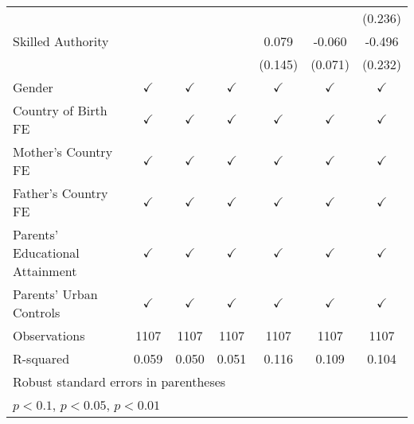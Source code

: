 \documentclass[]{article}
\begin{document}
\begin{table}
\begin{adjustbox}{width=\columnwidth,center}
{\begin{tabular}{l*{6}{c}}
                &                  &                  &                  &                  &                  &  (0.236)         \\
[1em]
Skilled Authority&                  &                  &                  &    0.079         &   -0.060         &   -0.496\sym{**} \\
                &                  &                  &                  &  (0.145)         &  (0.071)         &  (0.232)         \\
\hline
Gender          &$\checkmark$         &$\checkmark$         &$\checkmark$         &$\checkmark$         &$\checkmark$         &$\checkmark$         \\
Country of Birth FE&$\checkmark$         &$\checkmark$         &$\checkmark$         &$\checkmark$         &$\checkmark$         &$\checkmark$         \\
Mother's Country FE&$\checkmark$         &$\checkmark$         &$\checkmark$         &$\checkmark$         &$\checkmark$         &$\checkmark$         \\
Father's Country FE&$\checkmark$         &$\checkmark$         &$\checkmark$         &$\checkmark$         &$\checkmark$         &$\checkmark$         \\
Parents' Educational Attainment&$\checkmark$         &$\checkmark$         &$\checkmark$         &$\checkmark$         &$\checkmark$         &$\checkmark$         \\
Parents' Urban Controls&$\checkmark$         &$\checkmark$         &$\checkmark$         &$\checkmark$         &$\checkmark$         &$\checkmark$         \\
Observations    & 1107  & 1107    & 1107      & 1107   & 1107 & 1107     \\
R-squared       &    0.059         &    0.050         &    0.051         &    0.116         &    0.109         &    0.104         \\
\hline\hline
\multicolumn{7}{l}{\footnotesize Robust standard errors in parentheses}\\
\multicolumn{7}{l}{\footnotesize \sym{*} \(p<0.1\), \sym{**} \(p<0.05\), \sym{***} \(p<0.01\)}\\
\end{tabular}
}







\end{adjustbox}

\end{table}
\end{document}
